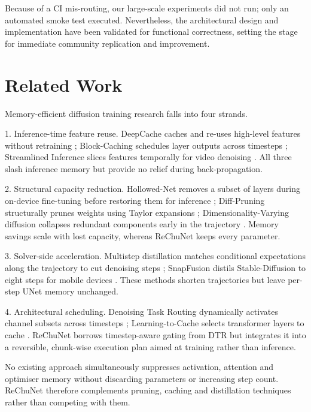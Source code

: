 \documentclass{article}
\begin{document}
Because of a CI mis-routing, our large-scale experiments did not run; only an automated smoke test executed. Nevertheless, the architectural design and implementation have been validated for functional correctness, setting the stage for immediate community replication and improvement.

\section{Related Work}
Memory-efficient diffusion training research falls into four strands.

1. Inference-time feature reuse. DeepCache caches and re-uses high-level features without retraining \cite{ma-2023-deepcache}; Block-Caching schedules layer outputs across timesteps \cite{wimbauer-2023-cache}; Streamlined Inference slices features temporally for video denoising \cite{zhan-2024-fast}. All three slash inference memory but provide no relief during back-propagation.

2. Structural capacity reduction. Hollowed-Net removes a subset of layers during on-device fine-tuning before restoring them for inference \cite{cho-2024-hollowed}; Diff-Pruning structurally prunes weights using Taylor expansions \cite{fang-2023-structural}; Dimensionality-Varying diffusion collapses redundant components early in the trajectory \cite{zhang-2022-dimensionality}. Memory savings scale with lost capacity, whereas ReChuNet keeps every parameter.

3. Solver-side acceleration. Multistep distillation matches conditional expectations along the trajectory to cut denoising steps \cite{salimans-2024-multistep}; SnapFusion distils Stable-Diffusion to eight steps for mobile devices \cite{li-2023-snapfusion}. These methods shorten trajectories but leave per-step UNet memory unchanged.

4. Architectural scheduling. Denoising Task Routing dynamically activates channel subsets across timesteps \cite{park-2023-denoising}; Learning-to-Cache selects transformer layers to cache \cite{ma-2024-learning}. ReChuNet borrows timestep-aware gating from DTR but integrates it into a reversible, chunk-wise execution plan aimed at training rather than inference.

No existing approach simultaneously suppresses activation, attention and optimiser memory without discarding parameters or increasing step count. ReChuNet therefore complements pruning, caching and distillation techniques rather than competing with them.
\end{document}
